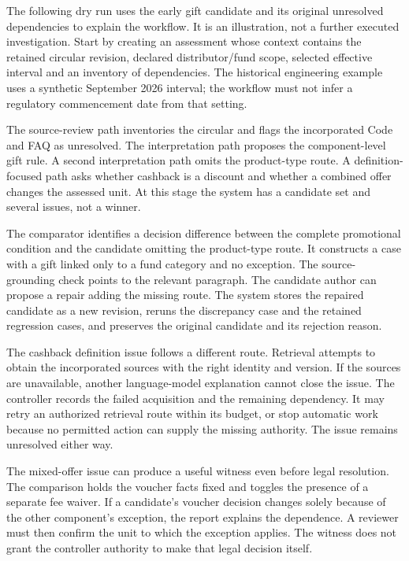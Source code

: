 \label{sec:circular-dryrun}
The following dry run uses the early gift candidate and its original unresolved
dependencies to explain the workflow. It is an illustration, not a further
executed investigation. Start by creating an assessment whose context
contains the retained circular revision, declared distributor/fund scope,
selected effective interval and an inventory of dependencies. The historical
engineering example uses a synthetic September 2026 interval; the workflow must
not infer a regulatory commencement date from that setting.

The source-review path inventories the circular and flags the incorporated Code
and FAQ as unresolved. The interpretation path proposes the component-level
gift rule. A second interpretation path omits the product-type route. A
definition-focused path asks whether cashback is a discount and whether a
combined offer changes the assessed unit. At this stage the system has a
candidate set and several issues, not a winner.

The comparator identifies a decision difference between the complete promotional
condition and the candidate omitting the product-type route. It constructs a
case with a gift linked only to a fund category and no exception. The
source-grounding check points to the relevant paragraph. The candidate author
can propose a repair adding the missing route. The system stores the repaired
candidate as a new revision, reruns the discrepancy case and the retained
regression cases, and preserves the original candidate and its rejection reason.

The cashback definition issue follows a different route. Retrieval attempts to
obtain the incorporated sources with the right identity and version. If the
sources are unavailable, another language-model explanation cannot close the
issue. The controller records the failed acquisition and the remaining
dependency. It may retry an authorized retrieval route within its budget, or
stop automatic work because no permitted action can supply the missing
authority. The issue remains unresolved either way.


The mixed-offer issue can produce a useful witness even before legal resolution.
The comparison holds the voucher facts fixed and toggles the presence of a
separate fee waiver. If a candidate's voucher decision changes solely because
of the other component's exception, the report explains the dependence. A
reviewer must then confirm the unit to which the exception applies. The witness
does not grant the controller authority to make that legal decision itself.

